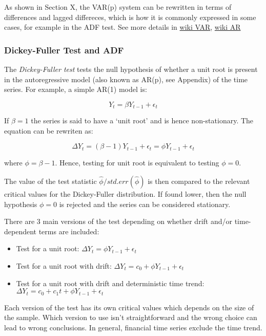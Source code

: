 \documentclass{article}
\providecommand{\tightlist}{%
      \setlength{\itemsep}{0pt}\setlength{\parskip}{0pt}}
\begin{document}
As shown in Section X, the VAR(p) system can be rewritten in terms of
differences and lagged differeces, which is how it is commonly expressed
in some cases, for example in the ADF test. See more details in
\href{https://en.wikipedia.org/wiki/Vector_autoregression}{wiki VAR},
\href{https://en.wikipedia.org/wiki/Autoregressive_model}{wiki AR}

    \subsubsection{Dickey-Fuller Test and
ADF}\label{dickey-fuller-test-and-adf}

The \emph{Dickey-Fuller test} tests the null hypothesis of whether a
unit root is present in the autoregressive model (also known as AR(p),
see Appendix) of the time series. For example, a simple AR(1) model is:

\[
Y_t = \beta Y_{t-1} + \epsilon_t
\]

If \(\beta=1\) the series is said to have a `unit root' and is hence
non-stationary. The equation can be rewriten as:

\[
\Delta Y_t = (\beta - 1) Y_{t-1} + \epsilon_t = \phi Y_{t-1} + \epsilon_t
\]

where \(\phi= \beta-1\). Hence, testing for unit root is equivalent to
testing \(\phi=0\).

The value of the test statistic \(\hat{\phi}/std.err(\hat{\phi})\) is
then compared to the relevant critical values for the Dickey-Fuller
distribution. If found lower, then the null hypothesis \(\phi=0\) is
rejected and the series can be considered stationary.

There are 3 main versions of the test depending on whether drift and/or
time-dependent terms are included:

\begin{itemize}
\tightlist
\item
  Test for a unit root: \(\Delta Y_t = \phi Y_{t-1} + \epsilon_t\)
\item
  Test for a unit root with drift:
  \(\Delta Y_t = c_0 + \phi Y_{t-1} + \epsilon_t\)
\item
  Test for a unit root with drift and deterministic time trend:
  \(\Delta Y_t = c_0 + c_1 t + \phi Y_{t-1} + \epsilon_t\)
\end{itemize}

Each version of the test has its own critical values which depends on
the size of the sample. Which version to use isn't straightforward and
the wrong choice can lead to wrong conclusions. In general, financial
time series exclude the time trend.
\end{document}
